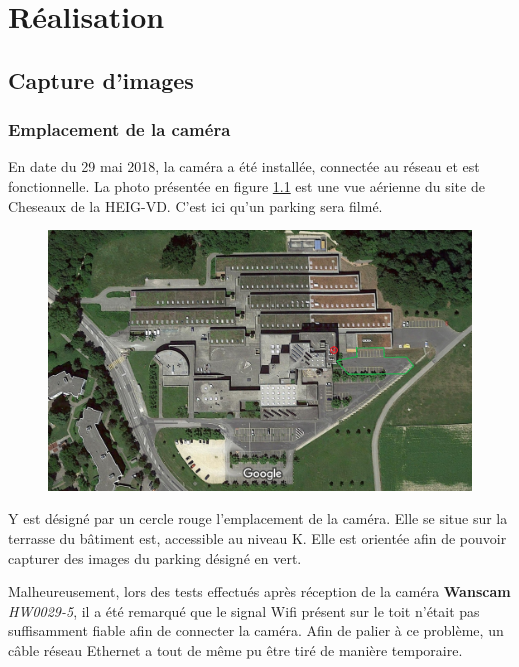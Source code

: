 \chapter{Réalisation}\label{realisation}

\section{Capture d'images}\label{realisation.capture}
\subsection{Emplacement de la caméra}
En date du 29 mai 2018, la caméra a été installée, connectée au réseau et est fonctionnelle. La photo présentée en figure \ref{fig:cam_parking_annotation} est une vue aérienne du site de Cheseaux de la HEIG-VD. C'est ici qu'un parking sera filmé.

\begin{figure}[H]
    \includegraphics[width=14cm]{img/conception/cam_parking_location.png}
    \centering
    \label{fig:cam_parking_annotation}
\end{figure} 

Y est désigné par un cercle rouge l'emplacement de la caméra. Elle se situe sur la terrasse du bâtiment est, accessible au niveau K. Elle est orientée afin de pouvoir capturer des images du parking désigné en vert. 

Malheureusement, lors des tests effectués après réception de la caméra \textbf{Wanscam} \textit{HW0029-5}, il a été remarqué que le signal Wifi présent sur le toit n'était pas suffisamment fiable afin de connecter la caméra. Afin de palier à ce problème, un câble réseau Ethernet a tout de même pu être tiré de manière temporaire.

